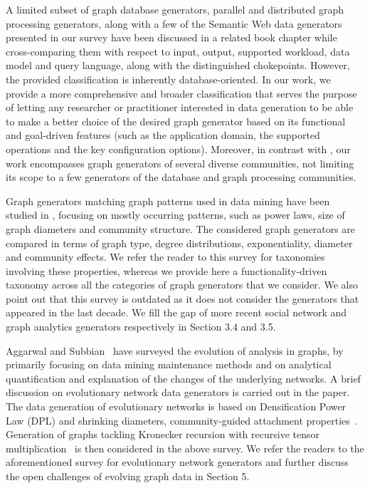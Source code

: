 A limited subset of graph database
generators, parallel and distributed graph processing generators, along
with a few of the Semantic Web data generators presented in our survey have
been discussed in a related book chapter
\cite{BFHI18} while cross-comparing them with respect to input, output,
supported workload, data model and query language, along with the
distinguished chokepoints. However, the provided classification is
inherently database-oriented.
In our work, we provide a more comprehensive and broader classification
 that serves the purpose of letting any
researcher or practitioner interested in data generation  to be able to make a better
choice of the desired graph
generator based on its functional and goal-driven features (such as the application domain,
the supported operations and the key configuration options).
Moreover, in contrast with \cite{BFHI18}, our work encompasses graph generators of several
diverse communities, not limiting its scope to a few generators of the database
and graph processing communities.

Graph generators matching graph patterns used in data mining have been
studied in \cite{Chakrabarti:2006:GML:1132952.1132954},
focusing on mostly occurring patterns, such as power laws, size of graph diameters
and community structure. The considered graph generators are compared in
terms of graph type, degree distributions, exponentiality, diameter and
community effects. We refer the reader to this survey for taxonomies
involving these properties, whereas we provide here a functionality-driven
taxonomy across all the categories of graph generators that we consider.
We also point out that this survey is outdated as it does not consider the
generators that appeared in the last decade.
We fill the gap of more recent social network and graph analytics generators
respectively in Section 3.4 and 3.5.


Aggarwal and Subbian~\cite{AggarwalS14} have surveyed the evolution of analysis in
graphs, by primarily focusing on data mining maintenance methods and on analytical
quantification and explanation of the changes of the underlying networks.
A brief discussion on evolutionary
network data generators is carried out in
the paper. The data generation of evolutionary networks is based on
Densification Power Law (DPL) and shrinking diameters, community-guided
attachment properties~\cite{Leskovec:2005:GOT:1081870.1081893}.
Generation of graphs tackling Kronecker
recursion with recursive tensor multiplication~\cite{AkogluMF08} is then considered in the above survey.
We refer the readers to the aforementioned survey for evolutionary network generators and further discuss the open challenges of evolving graph data in Section 5.


